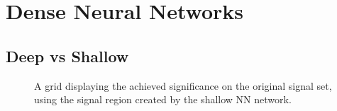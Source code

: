 \section{Dense Neural Networks}
\subsection{Deep vs Shallow}
\begin{figure}
    \caption{A grid displaying the achieved significance on the original signal set, using the signal region 
    created by the shallow \ac{NN} network.}
    \label{fig:NNshallowGridSig}
\end{figure}
